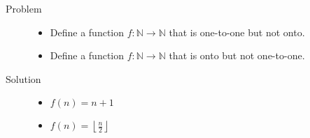 \begin{description}
\item[Problem]
\begin{itemize}
        \item Define a function $f : \mathbb{N} \rightarrow \mathbb{N}$ that
              is one-to-one but not onto.
        \item Define a function $f : \mathbb{N} \rightarrow \mathbb{N}$ that
              is onto but not one-to-one.
\end{itemize}
\item[Solution]
\begin{itemize}
        \item $f(n) = n + 1$
        \item $f(n) = \left\lfloor \frac n 2 \right\rfloor$
\end{itemize}
\end{description}
